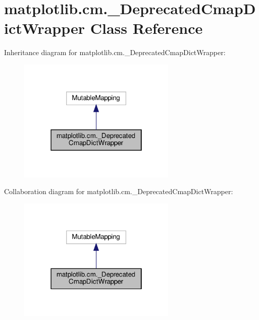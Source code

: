 \hypertarget{classmatplotlib_1_1cm_1_1__DeprecatedCmapDictWrapper}{}\section{matplotlib.\+cm.\+\_\+\+Deprecated\+Cmap\+Dict\+Wrapper Class Reference}
\label{classmatplotlib_1_1cm_1_1__DeprecatedCmapDictWrapper}


Inheritance diagram for matplotlib.\+cm.\+\_\+\+Deprecated\+Cmap\+Dict\+Wrapper\+:
\nopagebreak
\begin{figure}[H]
\begin{center}
\leavevmode
\includegraphics[width=214pt]{classmatplotlib_1_1cm_1_1__DeprecatedCmapDictWrapper__inherit__graph}
\end{center}
\end{figure}


Collaboration diagram for matplotlib.\+cm.\+\_\+\+Deprecated\+Cmap\+Dict\+Wrapper\+:
\nopagebreak
\begin{figure}[H]
\begin{center}
\leavevmode
\includegraphics[width=214pt]{classmatplotlib_1_1cm_1_1__DeprecatedCmapDictWrapper__coll__graph}
\end{center}
\end{figure}
